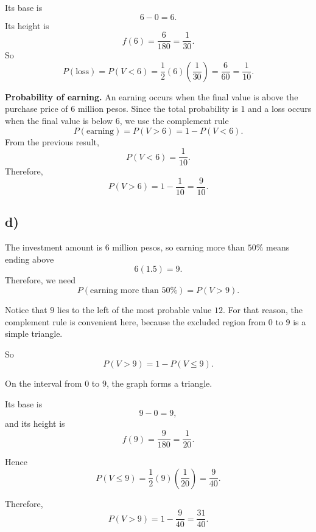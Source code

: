 	Its base is
	\[
	6-0=6.
	\]
	Its height is
	\[
	f(6)=\frac{6}{180}=\frac{1}{30}.
	\]
	So
	\[
	P(\text{loss})=P(V<6)=\frac12(6)\left(\frac{1}{30}\right)=\frac{6}{60}=\frac{1}{10}.
	\]
	
	\textbf{Probability of earning.}
	An earning occurs when the final value is above the purchase price of $6$ million pesos. Since the total probability is $1$ and a loss occurs when the final value is below $6$, we use the complement rule
	\[
	P(\text{earning})=P(V>6)=1-P(V<6).
	\]
	From the previous result,
	\[
	P(V<6)=\frac{1}{10}.
	\]
	Therefore,
	\[
	P(V>6)=1-\frac{1}{10}=\frac{9}{10}.
	\]
	
	\subsection*{d)}
	The investment amount is $6$ million pesos, so earning more than $50\%$ means ending above
	\[
	6(1.5)=9.
	\]
	Therefore, we need
	\[
	P(\text{earning more than }50\%)=P(V>9).
	\]
	
	Notice that $9$ lies to the left of the most probable value $12$. For that reason, the complement rule is convenient here, because the excluded region from $0$ to $9$ is a simple triangle.
	
	So
	\[
	P(V>9)=1-P(V\le 9).
	\]
	
	On the interval from $0$ to $9$, the graph forms a triangle.
	
	Its base is
	\[
	9-0=9,
	\]
	and its height is
	\[
	f(9)=\frac{9}{180}=\frac{1}{20}.
	\]
	
	Hence
	\[
	P(V\le 9)=\frac12(9)\left(\frac{1}{20}\right)=\frac{9}{40}.
	\]
	
	Therefore,
	\[
	P(V>9)=1-\frac{9}{40}=\frac{31}{40}.
	\]


